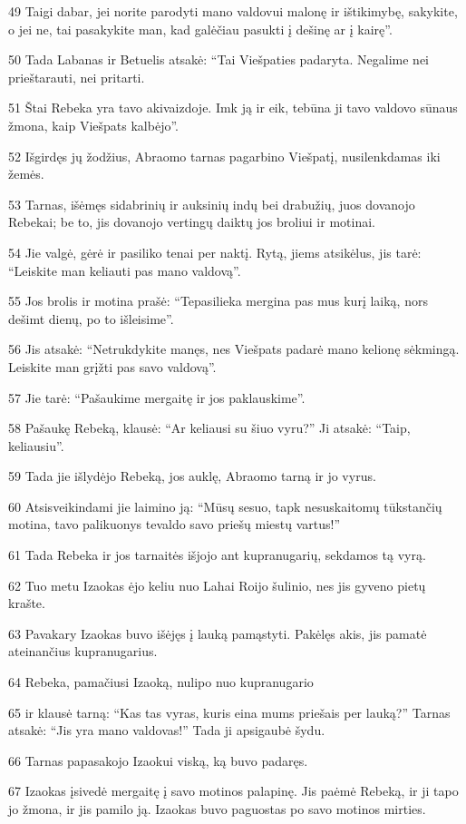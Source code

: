 \par 49 Taigi dabar, jei norite parodyti mano valdovui malonę ir ištikimybę, sakykite, o jei ne, tai pasakykite man, kad galėčiau pasukti į dešinę ar į kairę”. 
\par 50 Tada Labanas ir Betuelis atsakė: “Tai Viešpaties padaryta. Negalime nei prieštarauti, nei pritarti. 
\par 51 Štai Rebeka yra tavo akivaizdoje. Imk ją ir eik, tebūna ji tavo valdovo sūnaus žmona, kaip Viešpats kalbėjo”. 
\par 52 Išgirdęs jų žodžius, Abraomo tarnas pagarbino Viešpatį, nusilenkdamas iki žemės. 
\par 53 Tarnas, išėmęs sidabrinių ir auksinių indų bei drabužių, juos dovanojo Rebekai; be to, jis dovanojo vertingų daiktų jos broliui ir motinai. 
\par 54 Jie valgė, gėrė ir pasiliko tenai per naktį. Rytą, jiems atsikėlus, jis tarė: “Leiskite man keliauti pas mano valdovą”. 
\par 55 Jos brolis ir motina prašė: “Tepasilieka mergina pas mus kurį laiką, nors dešimt dienų, po to išleisime”. 
\par 56 Jis atsakė: “Netrukdykite manęs, nes Viešpats padarė mano kelionę sėkmingą. Leiskite man grįžti pas savo valdovą”. 
\par 57 Jie tarė: “Pašaukime mergaitę ir jos paklauskime”. 
\par 58 Pašaukę Rebeką, klausė: “Ar keliausi su šiuo vyru?” Ji atsakė: “Taip, keliausiu”. 
\par 59 Tada jie išlydėjo Rebeką, jos auklę, Abraomo tarną ir jo vyrus. 
\par 60 Atsisveikindami jie laimino ją: “Mūsų sesuo, tapk nesuskaitomų tūkstančių motina, tavo palikuonys tevaldo savo priešų miestų vartus!” 
\par 61 Tada Rebeka ir jos tarnaitės išjojo ant kupranugarių, sekdamos tą vyrą. 
\par 62 Tuo metu Izaokas ėjo keliu nuo Lahai Roijo šulinio, nes jis gyveno pietų krašte. 
\par 63 Pavakary Izaokas buvo išėjęs į lauką pamąstyti. Pakėlęs akis, jis pamatė ateinančius kupranugarius. 
\par 64 Rebeka, pamačiusi Izaoką, nulipo nuo kupranugario 
\par 65 ir klausė tarną: “Kas tas vyras, kuris eina mums priešais per lauką?” Tarnas atsakė: “Jis yra mano valdovas!” Tada ji apsigaubė šydu. 
\par 66 Tarnas papasakojo Izaokui viską, ką buvo padaręs. 
\par 67 Izaokas įsivedė mergaitę į savo motinos palapinę. Jis paėmė Rebeką, ir ji tapo jo žmona, ir jis pamilo ją. Izaokas buvo paguostas po savo motinos mirties.



